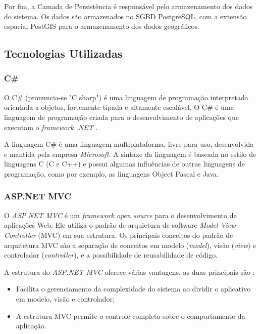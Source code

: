Por fim, a Camada de Persistência é responsável pelo armazenamento dos dados do sistema. Os dados são armazenados no SGBD PostgreSQL, com a extensão espacial PostGIS para o armazenamento dos dados geográficos.

\newpage

\subsection{Tecnologias Utilizadas}

\subsubsection{C\#}

O C\# (pronuncia-se "C sharp") é uma linguagem de programação interpretada orientada a objetos, fortemente tipada e altamente escalável. O C\# é uma linguagem de programação criada para o desenvolvimento de aplicações que executam o \textit{framework .NET} \cite{csharp}.

A linguagem C\# é uma linguagem multiplataforma, livre para uso, desenvolvida e mantida pela empresa \textit{Microsoft}. A sintaxe da linguagem é baseada no estilo de linguagens C (C e C++) e possui algumas influências de outras linguagens de programação, como por exemplo, as linguagens Object Pascal e Java.

\subsubsection{ASP.NET MVC}

O \textit{ASP.NET MVC} é um \textit{framework open source} \cite{mvcgit} para o desenvolvimento de aplicações Web. Ele utiliza o padrão de arquietura de software \textit{Model-View-Controller} (MVC) em sua estrutura. Os principais conceitos do padrão de arquitetura MVC são a separação de conceitos em modelo (\textit{model}), visão (\textit{view}) e controlador (\textit{controller}), e a possibilidade de reusabilidade de código.

A estrutura do \textit{ASP.NET MVC} oferece várias vantagens, as duas principais são \cite{mvc}:

\begin{itemize}
\item Facilita o gerenciamento da complexidade do sistema ao dividir o aplicativo em modelo, visão e controlador;
\item A estrutura MVC permite o controle completo sobre o comportamento da aplicação.
\end{itemize}

